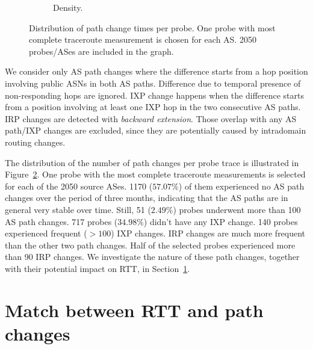 \begin{figure}[!htb]
\begin{subfigure}[b]{.48\textwidth}
	\caption{\footnotesize Density.}
	\label{fig:path_ch_count_density_cmp}
	\end{subfigure}
\caption{Distribution of path change times per probe. One probe with most complete traceroute measurement is chosen for each AS. 2050 probes/ASes are included in the graph.}
\label{fig:path_ch_count_cmp}
\end{figure}

We consider only AS path changes where the difference starts from a hop position involving public ASNs in both AS paths.
Difference due to temporal presence of non-responding hops are ignored.
IXP change happens when the difference starts from a position involving at least one IXP hop in the two consecutive AS paths.
IRP changes are detected with \textit{backward extension}. 
Those overlap with any AS path/IXP changes are excluded, since they are potentially caused by intradomain routing changes.

The distribution of the number of path changes per probe trace is illustrated in Figure~\ref{fig:path_ch_count_cmp}.
One probe with the most complete traceroute measurements is selected for each of the 2050 source ASes.
1170 ($57.07\%$) of them experienced no AS path changes over the period of three months, indicating that the AS paths are in general very stable over time.
Still, 51 ($2.49\%$) probes underwent more than 100 AS path changes.
717 probes ($34.98\%$) didn't have any IXP change.
140 probes experienced frequent ($> 100$) IXP changes.
IRP changes are much more frequent than the other two path changes. 
Half of the selected probes experienced more than 90 IRP changes.
We investigate the nature of these path changes, together with their potential impact on RTT, in Section~\ref{sec:corr}.

\section{Match between RTT and path changes}
\label{sec:corr}

